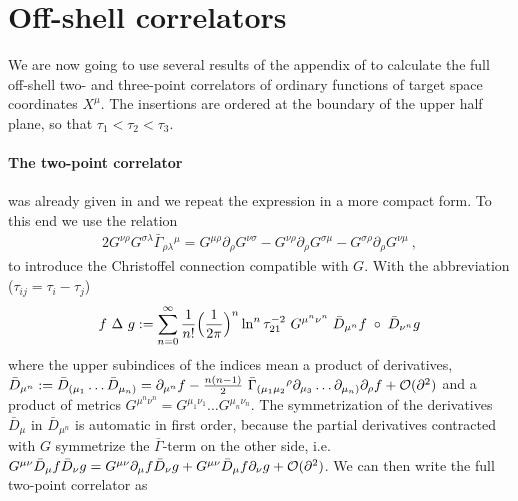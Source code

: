 \documentclass[a4paper,11pt]{article}               \def\new#1\endnew{{\bf #1}}
\newcommand {\cO}{{\cal O}}
\newcommand {\tria} {~\Delta~}
\begin{document}
\section{Off-shell correlators}
\label{sec:offshell}


We are now going to use several results of the appendix of 
\cite{Herbst:2001ai} to calculate the full off-shell two- and three-point
correlators of ordinary functions of target space coordinates $X^\mu$. 
The insertions are ordered at the boundary of the upper half plane, so
that $\tau_1 < \tau_2 < \tau_3$.

\paragraph{The two-point correlator} \hspace*{-0.3cm}was already given in
\cite{Herbst:2001ai} and we repeat the expression in a more compact form. 
To this end we use the relation
\begin{eqnarray}
  \label{eq:Gconnect}
  2 G^{\nu\rho} G^{\sigma\lambda} \bar \Gamma_{\rho\lambda}{}^{\mu} =
  G^{\mu\rho} \partial_\rho G^{\nu\sigma}-
  G^{\nu\rho} \partial_\rho G^{\sigma\mu}-
  G^{\sigma\rho} \partial_\rho G^{\nu\mu}~,
\end{eqnarray}
to introduce the Christoffel connection compatible with $G$. 
With the abbreviation ($\tau_{ij} = \tau_i - \tau_j$)
\begin{eqnarray}
  \label{eq:triangle}
  f \tria g := \sum _{n=0}^\infty 
             \frac 1{n!} \Bigl(\frac{1}{2\pi}\Bigr)^n
             \ln^n\tau_{21}^{-2}~G^{\mu^n\nu^n} \;
             \bar D_{\mu^n} f \; \circ \;
             \bar D_{\nu^n}g
\end{eqnarray}
where the upper subindices of the indices mean a product of derivatives,
$\bar D_{\mu^n} := \bar D_{(\mu_1} \ldots \bar D_{\mu_n)} =\partial_{\mu^n} f - \frac {n(n-1)}{2}~\bar\Gamma_{(\mu_1\mu_2}{}^\rho \partial_{\mu_3}\ldots\partial_{\mu_n)} \partial_{\rho} f + \cO(\partial^2)$
and a product of metrics
$G^{\mu^n\nu^n}=G^{\mu_1\nu_1}\ldots G^{\mu_n\nu_n}$. The symmetrization
of the derivatives $\bar D_{\mu}$ in $\bar D_{\mu^n}$
is automatic in first order, because the partial derivatives contracted with
$G$ symmetrize the $\bar\Gamma$-term on the other side, i.e.
$G^{\mu\nu} \bar D_\mu f \bar D_\nu g = G^{\mu\nu} \partial_\mu f \bar D_\nu g + G^{\mu\nu} \bar D_\mu f \partial_\nu g + \cO(\partial^2)$. 
We can then write the full two-point correlator as
\end{document}
